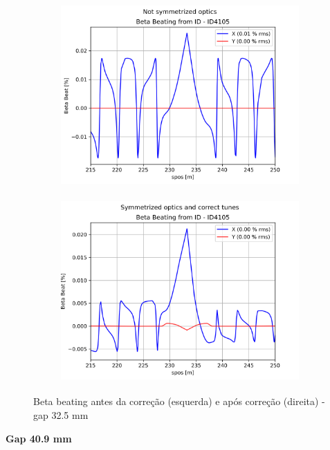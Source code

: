\documentclass[a4paper,12pt]{article}
\begin{document}
\begin{figure}[H]
\begin{subfigure}{0.5\textwidth}
\includegraphics[width=0.9\linewidth, height=7cm]{figs/phase16 gap32 uncorrected-optics.png} 
\label{fig:subim11632}
\end{subfigure}
\begin{subfigure}{0.5\textwidth}
\includegraphics[width=0.9\linewidth, height=7cm]{figs/phase16 gap32 corrected-optics-tunes.png}
\label{fig:subim216232}
\end{subfigure}
\caption{Beta beating antes da correção (esquerda) e após correção (direita) - gap 32.5 mm}
\label{fig:bb16_32}
\end{figure}

\textbf{Gap 40.9 mm} \\
\end{document}
